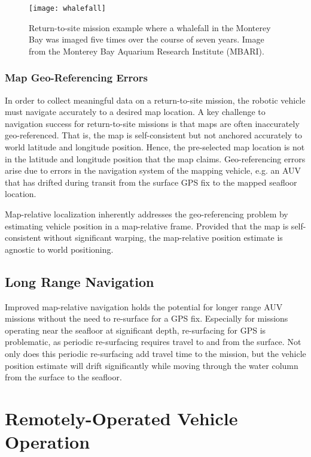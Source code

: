 \begin{figure}[!h]
	\centering
		\texttt{[image: whalefall]}
	\caption{Return-to-site mission example where a whalefall in the Monterey Bay was imaged five times over the course of seven years.  Image from the Monterey Bay Aquarium Research Institute (MBARI). }
	\label{fig:whalefall}
\end{figure}

\subsubsection{Map Geo-Referencing Errors}
\label{intro.Motivation.Return.Geo}

In order to collect meaningful data on a return-to-site mission, the robotic vehicle must navigate accurately to a desired map location.
A key challenge to navigation success for return-to-site missions is that maps are often inaccurately geo-referenced.  
That is, the map is self-consistent but not anchored accurately to world latitude and longitude position.  
Hence, the pre-selected map location is not in the latitude and longitude position that the map claims.  
Geo-referencing errors arise due to errors in the navigation system of the mapping vehicle, e.g. an AUV that has drifted during transit from the surface GPS fix to the mapped seafloor location. 

Map-relative localization inherently addresses the geo-referencing problem by estimating vehicle position in a map-relative frame.  
Provided that the map is self-consistent without significant warping, the map-relative position estimate is agnostic to world positioning.  

\subsection{Long Range Navigation}
\label{intro.Motivation.Long}

Improved map-relative navigation holds the potential for longer range AUV missions without the need to re-surface for a GPS fix.  
Especially for missions operating near the seafloor at significant depth, re-surfacing for GPS is problematic, as periodic re-surfacing requires travel to and from the surface.  
Not only does this periodic re-surfacing add travel time to the mission, but the vehicle position estimate will drift significantly while moving through the water column from the surface to the seafloor.  

\section{Remotely-Operated Vehicle Operation}
\label{intro.Remotely}


